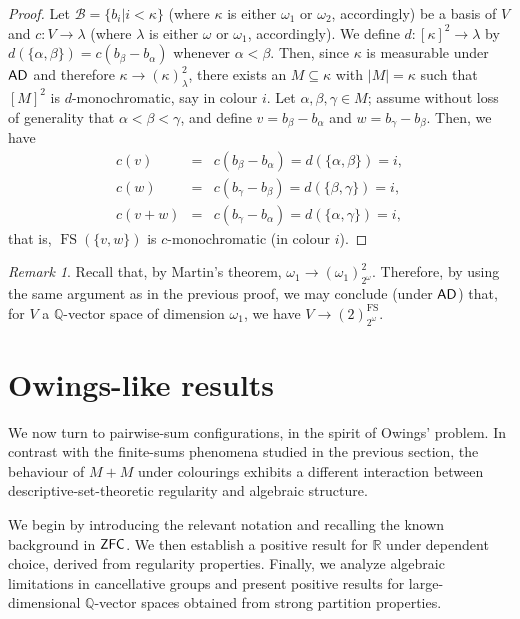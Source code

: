 \documentclass[10pt,a4paper]{amsart}
\theoremstyle{definition}
\newcommand{\ad}{\mathnormal{\mathsf{AD}}}
\newcommand{\zfc}{\mathnormal{\mathsf{ZFC}}}
\theoremstyle{remark}
\newtheorem{remark}[theorem]{Remark}
\numberwithin{equation}{section}
\begin{document}
    \begin{proof}
        Let $\mathcal{B}=\{b_{i}|i<\kappa\}$ (where $\kappa$ is either $\omega_1$ or $\omega_2$, accordingly) be a basis of $V$ and $c:V\to\lambda$ (where $\lambda$ is either $\omega$ or $\omega_1$, accordingly). We define $d:[\kappa]^{2}\to\lambda$ by $d(\{\alpha,\beta\})=c(b_{\beta}-b_{\alpha})$ whenever $\alpha<\beta$. Then, since $\kappa$ is measurable under $\ad$ and therefore $\kappa\longrightarrow(\kappa)_\lambda^2$, there exists an $M\subseteq\kappa$ with $|M|=\kappa$ such that $[M]^2$ is $d$-monochromatic, say in colour $i$. Let $\alpha,\beta,\gamma\in M$; assume without loss of generality that $\alpha<\beta<\gamma$, and define $v=b_\beta-b_\alpha$ and $w=b_\gamma-b_\beta$. Then, we have
        \begin{eqnarray*}
            c(v)&=&c(b_{\beta}-b_{\alpha})=d(\{\alpha,\beta\})=i,\\
            c(w)&=& c(b_\gamma-b_\beta)=d(\{\beta,\gamma\})=i,\\
            c(v+w)&=& c(b_{\gamma}-b_{\alpha})=d(\{\alpha,\gamma\})=i,
        \end{eqnarray*}
        that is, $\operatorname{FS}(\{v,w\})$ is $c$-monochromatic (in colour $i$).
    \end{proof}
    
    \begin{remark} \label{rem:hindman-omega2}
        Recall that, by Martin's theorem, $\omega_1\to(\omega_1)_{2^\omega}^2$. Therefore, by using the same argument as in the previous proof, we may conclude (under $\ad$) that, for $V$ a $\mathbb Q$-vector space of dimension $\omega_1$, we have $V\to(2)^{\operatorname{FS}}_{2^\omega}$.
    \end{remark}
   

\section{Owings-like results}\label{sec:owings}

We now turn to pairwise-sum configurations, in the spirit of Owings’ problem. 
In contrast with the finite-sums phenomena studied in the previous section, the behaviour of $M+M$ under colourings exhibits a different interaction between descriptive-set-theoretic regularity and algebraic structure.

We begin by introducing the relevant notation and recalling the known background in $\zfc$. 
We then establish a positive result for $\mathbb{R}$ under dependent choice, derived from regularity properties. 
Finally, we analyze algebraic limitations in cancellative groups and present positive results for large-dimensional $\mathbb{Q}$-vector spaces obtained from strong partition properties.
\end{document}
